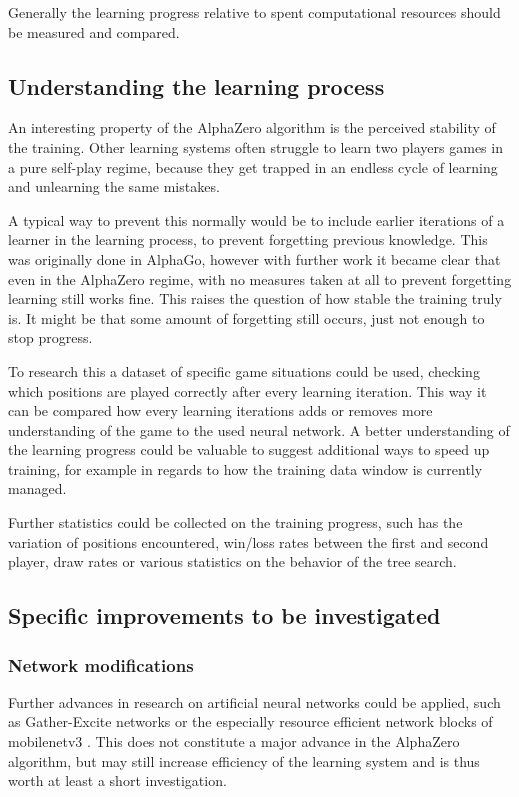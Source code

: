 \documentclass[12pt,onecolumn,oneside,titlepage]{article}
\begin{document}
Generally the learning progress relative to spent computational resources should be measured and compared.

\subsection{Understanding the learning process}

An interesting property of the AlphaZero algorithm is the perceived stability of the training. Other learning systems often struggle to learn two players games in a pure self-play regime, because they get trapped in an endless cycle of learning and unlearning the same mistakes.

A typical way to prevent this normally would be to include earlier iterations of a learner in the learning process, to prevent forgetting previous knowledge.
This was originally done in AlphaGo, however with further work it became clear that even in the AlphaZero regime, with no measures taken at all to prevent forgetting learning still works fine.
This raises the question of how stable the training truly is. It might be that some amount of forgetting still occurs, just not enough to stop progress.

To research this a dataset of specific game situations could be used, checking which positions are played correctly after every learning iteration. This way it can be compared how every learning iterations adds or removes more understanding of the game to the used neural network.
A better understanding of the learning progress could be valuable to suggest additional ways to speed up training, for example in regards to how the training data window is currently managed.

Further statistics could be collected on the training progress, such has the variation of positions encountered, win/loss rates between the first and second player, draw rates or various statistics on the behavior of the tree search.

\subsection{Specific improvements to be investigated}

\subsubsection{Network modifications}

Further advances in research on artificial neural networks could be applied, such as Gather-Excite networks \cite{DBLP:journals/corr/abs-1810-12348} or the especially resource efficient network blocks of mobilenetv3 \cite{howard2019searching}.
This does not constitute a major advance in the AlphaZero algorithm, but may still increase efficiency of the learning system and is thus worth at least a short investigation.
\end{document}
